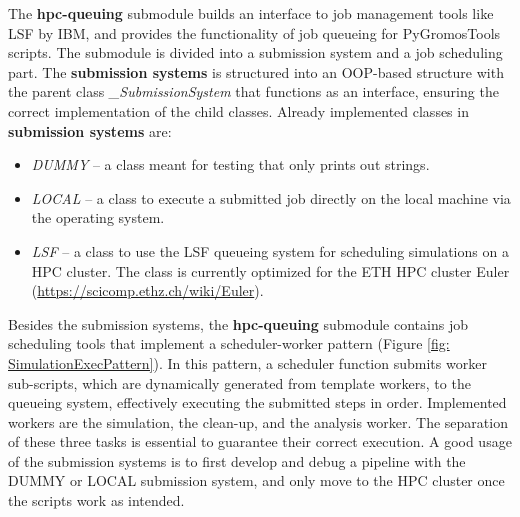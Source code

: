 The \textbf{hpc-queuing} submodule builds an interface to job management tools like LSF by IBM, and provides the functionality of job queueing for PyGromosTools scripts. The submodule is divided into a submission system and a job scheduling part. The \textbf{submission systems} is structured into an OOP-based structure with the parent class \textit{\_SubmissionSystem} that functions as an interface, ensuring the correct implementation of the child classes. Already implemented classes in \textbf{submission systems} are: 
\begin{itemize}
\item \textit{DUMMY} -- a class meant for testing that only prints out strings. 
\item \textit{LOCAL} -- a class to execute a submitted job directly on the local machine via the operating system.
\item \textit{LSF} -- a class to use the LSF queueing system for scheduling simulations on a HPC cluster. The class is currently optimized for the ETH HPC cluster Euler (\url{https://scicomp.ethz.ch/wiki/Euler}).
\end{itemize}
Besides the submission systems, the \textbf{hpc-queuing} submodule contains job scheduling tools that implement a scheduler-worker pattern (Figure \ref{fig: SimulationExecPattern}). In this pattern, a scheduler function submits worker sub-scripts, which are dynamically generated from template workers, to the queueing system, effectively executing the submitted steps in order. Implemented workers are the simulation, the clean-up, and the analysis worker. The separation of these three tasks is essential to guarantee their correct execution.
%
A good usage of the submission systems is to first develop and debug a pipeline with the DUMMY or LOCAL submission system, and only move to the HPC cluster once the scripts work as intended. %

